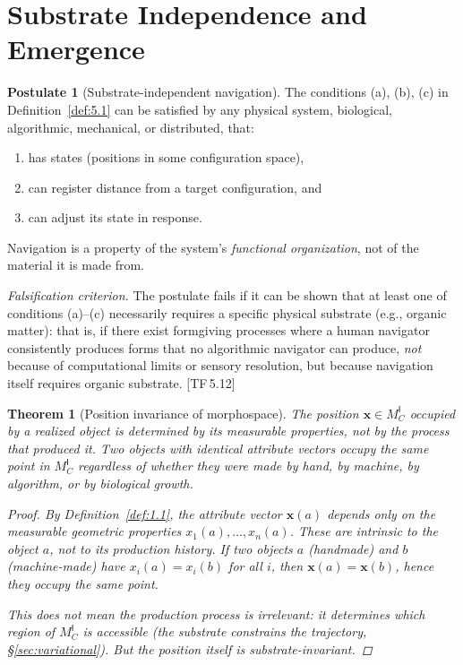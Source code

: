 \documentclass[10pt]{article}
\theoremstyle{definition}
\newtheorem{postulate}[definition]{Postulate}
\theoremstyle{plain}
\newtheorem{theorem}[definition]{Theorem}
\theoremstyle{remark}
\newcommand{\MC}{M^{\mathsf{I}}_C}          %
\newcommand{\TF}[1]{\textnormal{[TF\,#1]}}  %
\begin{document}
\newpage
\section{Substrate Independence and Emergence}%
\label{sec:substrate}

\begin{postulate}[Substrate-independent navigation]\label{post:7.1}
The conditions (a), (b), (c) in Definition~\ref{def:5.1} can be
satisfied by any physical system, biological, algorithmic, mechanical,
or distributed, that:
\begin{enumerate}[label=(\roman*),nosep]
  \item has states (positions in some configuration space),
  \item can register distance from a target configuration, and
  \item can adjust its state in response.
\end{enumerate}
Navigation is a property of the system's \emph{functional organization},
not of the material it is made from.

\medskip\noindent
\textit{Falsification criterion.}
The postulate fails if it can be shown that at least one of conditions
(a)--(c) necessarily requires a specific physical substrate (e.g.,
organic matter): that is, if there exist formgiving processes where a
human navigator consistently produces forms that no algorithmic navigator
can produce, \emph{not} because of computational limits or sensory
resolution, but because navigation itself requires organic substrate.
\TF{5.12}
\end{postulate}

\begin{theorem}[Position invariance of morphospace]%
\label{thm:7.2}
The position $\bm{x} \in \MC$ occupied by a realized object is
determined by its measurable properties, not by the process that
produced it. Two objects with identical attribute vectors occupy the
same point in $\MC$ regardless of whether they were made by hand, by
machine, by algorithm, or by biological growth.

\begin{proof}
By Definition~\ref{def:1.1}, the attribute vector $\bm{x}(a)$ depends
only on the measurable geometric properties $x_1(a), \ldots, x_n(a)$.
These are intrinsic to the object $a$, not to its production history.
If two objects $a$ (handmade) and $b$ (machine-made) have
$x_i(a) = x_i(b)$ for all $i$, then $\bm{x}(a) = \bm{x}(b)$,
hence they occupy the same point.

This does \emph{not} mean the production process is irrelevant: it
determines which region of $\MC$ is accessible (the substrate constrains
the trajectory, \S\ref{sec:variational}). But the position itself is
substrate-invariant. \qedhere
\end{proof}
\end{theorem}
\end{document}
